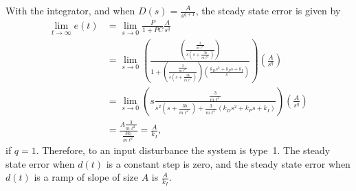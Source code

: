 With the integrator, and when $D(s)= \frac{A}{s^{q+1}}$, the steady state error is given by
\begin{align*}
\lim_{t\to\infty} e(t) &= \lim_{s\to 0} \frac{P}{1+PC}\frac{A}{s^q} \\
&= \lim_{s\to 0} \left(\frac{\left(\frac{\frac{3}{m\ell^2}}{s(s+\frac{3b}{m\ell^2})}\right)}{1+\left(\frac{\frac{3}{m\ell^2}}{s(s+\frac{3b}{m\ell^2})}\right)\left(\frac{k_Ds^2+k_Ps+k_I}{s}\right)}\right)\left(\frac{A}{s^q}\right) \\
&= \lim_{s\to 0} \left(s\frac{\frac{3}{m\ell^2}}{s^2(s+\frac{3b}{m\ell^2})+\frac{3}{m\ell^2}(k_Ds^2+k_Ps+k_I)}\right)\left(\frac{A}{s^q}\right) \\
&= \frac{A\frac{3}{m\ell^2}}{\frac{3k_I}{m\ell^2}} 
= \frac{A}{k_I},
\end{align*}
if $q=1$.  Therefore, to an input disturbance the system is type~1.  The steady state error when $d(t)$ is a constant step is zero, and the steady state error when $d(t)$ is a ramp of slope of size $A$ is $\frac{A}{k_I}$.  
